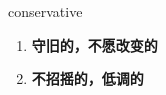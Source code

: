 
\begin{frame}
{\huge conservative}
\begin{center}
\begin{enumerate}\Large
  \item \textbf{守旧的，不愿改变的}
  \item \textbf{不招摇的，低调的}
\end{enumerate}
\end{center}
\end{frame}
